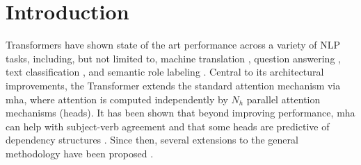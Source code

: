 \section{Introduction}
\label{sec:introduction}


Transformers \citep{vaswani2017attention} have shown state of the art performance across a variety of NLP tasks, including, but not limited to, machine translation \citep{vaswani2017attention,ott2018scaling}, question answering \citep{devlin2018bert}, text classification \citep{radford2018improving}, and semantic role labeling \citep{strubell2018linguistically}. Central to its architectural improvements, the Transformer extends the standard attention mechanism \citep{bahdanau15alignandtranslate,cho2014learning} via \ac{mha}, where attention is computed independently by $N_h$ parallel attention mechanisms (heads). It has been shown that beyond improving performance, \ac{mha} can help with subject-verb agreement \citep{tang2018why} and that some heads are predictive of dependency structures \citep{raganato2018analysis}. Since then, several extensions to the general methodology have been proposed \citep{ahmed2017weighted,Shen2018DiSANDS}. 




